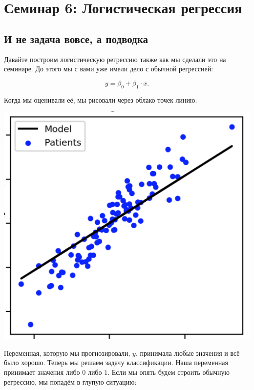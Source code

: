 \documentclass[12pt, a4paper, oneside]{article}
\begin{document}
	
\section*{Семинар 6: Логистическая регрессия}

\subsection*{И не задача вовсе, а подводка}

Давайте построим логистическую регрессию также как мы сделали это на семинаре.  До этого мы с вами уже имели дело с обычной регрессией: 

$$
y = \beta_0 + \beta_1 \cdot x.
$$

Когда мы оценивали её, мы рисовали через облако точек линию: 

\begin{center}
	\includegraphics[scale=0.12]{regr.png}
\end{center}

Переменная, которую мы прогнозировали, $y$, принимала любые значения и всё было хорошо. Теперь мы решаем задачу классификации. Наша переменная принимает значения либо $0$ либо $1$. Если мы опять будем строить обычную регрессию, мы попадём в глупую ситуацию: 
\end{document}

